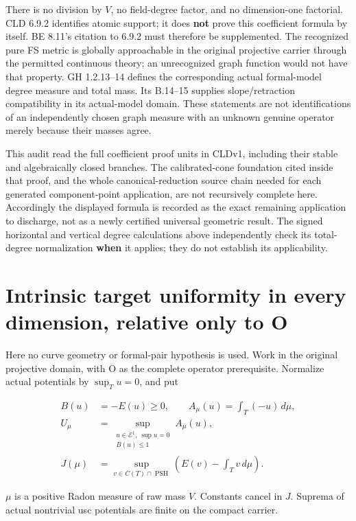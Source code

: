 \documentclass[
  11pt,
]{article}
\begin{document}
There is no division by \(V\), no field-degree factor, and no
dimension-one factorial. CLD 6.9.2 identifies atomic support; it does
\textbf{not} prove this coefficient formula by itself. BE 8.11's
citation to 6.9.2 must therefore be supplemented. The recognized pure FS
metric is globally approachable in the original projective carrier
through the permitted continuous theory; an unrecognized graph function
would not have that property. GH 1.2.13--14 defines the corresponding
actual formal-model degree measure and total mass. Its B.14--15 supplies
slope/retraction compatibility in its actual-model domain. These
statements are not identifications of an independently chosen graph
measure with an unknown genuine operator merely because their masses
agree.

This audit read the full coefficient proof units in CLDv1, including
their stable and algebraically closed branches. The calibrated-cone
foundation cited inside that proof, and the whole canonical-reduction
source chain needed for each generated component-point application, are
not recursively complete here. Accordingly the displayed formula is
recorded as the exact remaining application to discharge, not as a newly
certified universal geometric result. The signed horizontal and vertical
degree calculations above independently check its total-degree
normalization \textbf{when} it applies; they do not establish its
applicability.

\section{Intrinsic target uniformity in every dimension, relative only
to
O}\label{intrinsic-target-uniformity-in-every-dimension-relative-only-to-o}

Here no curve geometry or formal-pair hypothesis is used. Work in the
original projective domain, with O as the complete operator
prerequisite. Normalize actual potentials by \(\sup_Tu=0\), and put

\[
\begin{aligned}
B(u)&=-E(u)\geq0,\qquad A_\mu(u)=\int_T(-u)\,d\mu,\\
U_\mu&=\sup_{\substack{u\in\mathcal E^1,\ \sup u=0\\ B(u)\leq1}}A_\mu(u),\\
J(\mu)&=\sup_{v\in C(T)\cap\operatorname{PSH}}
 \left(E(v)-\int_Tv\,d\mu\right).
\end{aligned}
\]

\(\mu\) is a positive Radon measure of raw mass \(V\). Constants cancel
in \(J\). Suprema of actual nontrivial usc potentials are finite on the
compact carrier.
\end{document}
